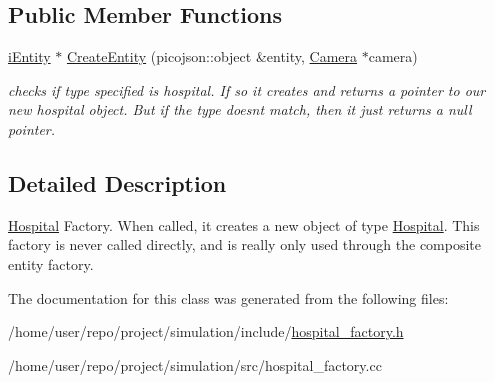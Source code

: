 \subsection*{Public Member Functions}
\begin{DoxyCompactItemize}
\item 
\mbox{\label{classHospitalFactory_abadf830ce14fcba272af78611c97791d}} 
\hyperlink{classiEntity}{i\+Entity} $\ast$ \hyperlink{classHospitalFactory_abadf830ce14fcba272af78611c97791d}{Create\+Entity} (picojson\+::object \&entity, \hyperlink{classCamera}{Camera} $\ast$camera)
\begin{DoxyCompactList}\small\item\em checks if type specified is hospital. If so it creates and returns a pointer to our new hospital object. But if the type doesn\textquotesingle{}t match, then it just returns a null pointer. \end{DoxyCompactList}\end{DoxyCompactItemize}


\subsection{Detailed Description}
\hyperlink{classHospital}{Hospital} Factory. When called, it creates a new object of type \hyperlink{classHospital}{Hospital}. This factory is never called directly, and is really only used through the composite entity factory. 

The documentation for this class was generated from the following files\+:\begin{DoxyCompactItemize}
\item 
/home/user/repo/project/simulation/include/\hyperlink{hospital__factory_8h}{hospital\+\_\+factory.\+h}\item 
/home/user/repo/project/simulation/src/hospital\+\_\+factory.\+cc\end{DoxyCompactItemize}
